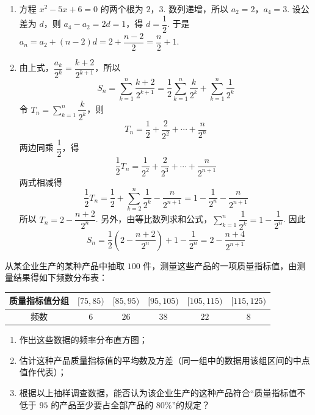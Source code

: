 \begin{solution}
\begin{enumerate}
\item 方程 \(x^2-5x+6=0\) 的两个根为 \(2\)，\(3\). 数列递增，所以 \(a_2=2\)，\(a_4=3\). 设公差为 \(d\)，则 \(a_4-a_2=2d=1\)，得 \(d=\dfrac12\). 于是 \(a_n=a_2+(n-2)d=2+\dfrac{n-2}{2}=\dfrac n2+1\).
\item 由上式，\(\dfrac{a_k}{2^k}=\dfrac{k+2}{2^{k+1}}\)，所以
\[S_n=\sum_{k=1}^{n}\frac{k+2}{2^{k+1}}=\frac12\sum_{k=1}^{n}\frac{k}{2^k}+\sum_{k=1}^{n}\frac1{2^k}\]
令 \(T_n=\sum_{k=1}^{n}\dfrac{k}{2^k}\)，则
\[T_n=\frac12+\frac{2}{2^2}+\cdots+\frac{n}{2^n}\]
两边同乘 \(\dfrac12\)，得
\[\frac12T_n=\frac1{2^2}+\frac{2}{2^3}+\cdots+\frac{n}{2^{n+1}}\]
两式相减得
\[\frac12T_n=\frac12+\sum_{k=2}^{n}\frac1{2^k}-\frac{n}{2^{n+1}}=1-\frac1{2^n}-\frac{n}{2^{n+1}}\]
所以 \(T_n=2-\dfrac{n+2}{2^n}\). 另外，由等比数列求和公式，\(\sum_{k=1}^{n}\dfrac1{2^k}=1-\dfrac1{2^n}\). 因此
\[S_n=\frac12\left(2-\frac{n+2}{2^n}\right)+1-\frac1{2^n}=2-\frac{n+4}{2^{n+1}}\]
\end{enumerate}
\end{solution}

\begin{problem}
从某企业生产的某种产品中抽取 \(100\) 件，测量这些产品的一项质量指标值，由测量结果得如下频数分布表：

\begin{center}
\begin{tabular}{c|ccccc}
\hline
质量指标值分组 & \([75,85)\) & \([85,95)\) & \([95,105)\) & \([105,115)\) & \([115,125)\) \\
\hline
频数 & \(6\) & \(26\) & \(38\) & \(22\) & \(8\) \\
\hline
\end{tabular}
\end{center}

\begin{enumerate}
\item 作出这些数据的频率分布直方图；
\item 估计这种产品质量指标值的平均数及方差（同一组中的数据用该组区间的中点值作代表）；
\item 根据以上抽样调查数据，能否认为该企业生产的这种产品符合“质量指标值不低于 \(95\) 的产品至少要占全部产品的 \(80\%\)”的规定？
\end{enumerate}

\FloatBarrier
\end{problem}

